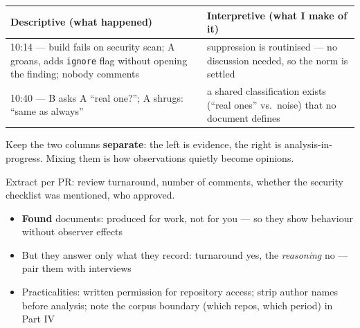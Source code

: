 \documentclass[11pt,a4paper,british,twoside=false,headings=small,chapterprefix=false,numbers=noenddot]{scrbook}
\newenvironment{block}[1]{\begin{tcolorbox}[scriptbox, title={#1}]}{\end{tcolorbox}}
\begin{document}
\begin{center}\small
\small
  \renewcommand{\arraystretch}{1.4}
  \begin{tabular}{@{}p{6.4cm}p{6.4cm}@{}}
    \toprule
    \textbf{Descriptive (what happened)} & \textbf{Interpretive (what I make of it)}\\
    \midrule
    10:14 --- build fails on security scan; A groans, adds \texttt{ignore} flag without opening the finding; nobody comments & suppression is routinised --- no discussion needed, so the norm is settled\\
    10:40 --- B asks A ``real one?''; A shrugs: ``same as always'' & a shared classification exists (``real ones'' vs.\ noise) that no document defines\\
    \bottomrule
  \end{tabular}
  

  Keep the two columns \textbf{separate}: the left is evidence, the right is
  analysis-in-progress. Mixing them is how observations quietly become
  opinions.
\end{center}

\begin{center}\small
\begin{block}{Corpus: 6 months of pull requests in the client's main repository}
    Extract per PR: review turnaround, number of comments, whether the
    security checklist was mentioned, who approved.
  \end{block}
  
  \begin{itemize}\setlength{\itemsep}{0.4em}
    \item \textbf{Found} documents: produced for work, not for you --- so
          they show behaviour without observer effects
    \item But they answer only what they record: turnaround yes, the
          \emph{reasoning} no --- pair them with interviews
    \item Practicalities: written permission for repository access; strip
          author names before analysis; note the corpus boundary (which
          repos, which period) in Part IV
  \end{itemize}
\end{center}
\end{document}
